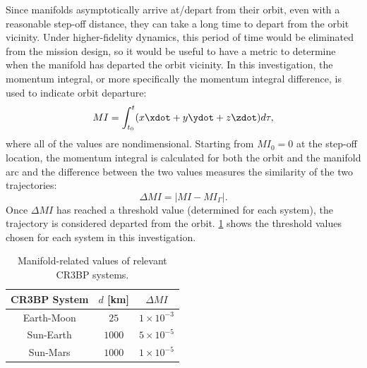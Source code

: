 Since manifolds asymptotically arrive at/depart from their orbit, even with a reasonable step-off
distance, they can take a long time to depart from the orbit vicinity. Under higher-fidelity
dynamics, this period of time would be eliminated from the mission design, so it would be useful to
have a metric to determine when the manifold has departed the orbit vicinity. In this
investigation, the momentum integral, or more specifically the momentum integral difference, is
used to indicate orbit departure:
\begin{equation}
    MI=\int_{t_{0}}^{t}(x\xdot+y\ydot+z\zdot)d\tau,
    \label{eq:momentumintegral}
\end{equation}
where all of the values are nondimensional. Starting from $MI_{0}=0$ at the step-off location, the
momentum integral is calculated for both the orbit and the manifold arc and the difference between
the two values measures the similarity of the two trajectories:
\begin{equation}
    \Delta MI=|MI-MI_{\Gamma}|.
    \label{eq:momentumdifference}
\end{equation}
Once $\Delta MI$ has reached a threshold value (determined for each system), the trajectory is
considered departed from the orbit\cite{Guzzetti:2017}. \cref{tab:manifoldValues} shows the
threshold values chosen for each system in this investigation.

\begin{table}[ht]
    \centering
    \caption{Manifold-related values of relevant CR3BP systems.}
    \begin{tabular}{|c|c|c|}
        \hline
        \textbf{CR3BP System}   &   \boldmath$d$ \textbf{[km]}  &   \boldmath$\Delta MI$    \\  \hline
        Earth-Moon              &   $25$                        &   $1\times10^{-3}$        \\  \hline
        Sun-Earth               &   $1000$                      &   $5\times10^{-5}$        \\  \hline
        Sun-Mars                &   $1000$                      &   $1\times10^{-5}$        \\  \hline
    \end{tabular}
    \label{tab:manifoldValues}
\end{table}
